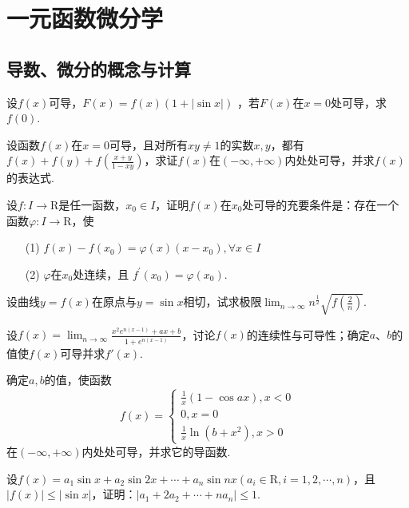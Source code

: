 \chapter{一元函数微分学}\label{cha:2}
\section{导数、微分的概念与计算}
\begin{xiti}
	\item 设$f(x)$可导，$F ( x ) = f ( x ) ( 1 + | \sin x | )$	，若$F(x)$在$x=0$处可导，求$f(0)$.
	\item 设函数$f(x)$在$x=0$可导，且对所有$xy\ne 1$的实数$x,y$，都有$f ( x ) + f ( y ) + f \left( \frac { x + y } { 1 - x y } \right)$，求证$f(x)$在$(-\infty,+\infty)$内处处可导，并求$f(x)$的表达式.
	\item 设$f : I \rightarrow \mathrm { R }$是任一函数，$x_{0}\in I$，证明$f(x)$在$x_{0}$处可导的充要条件是：存在一个函数$\varphi : I \rightarrow \mathrm { R }$，使
	\begin{enumerate}
		\item[(1)] $f ( x ) - f \left( x _ { 0 } \right) = \varphi ( x ) \left( x - x _ { 0 } \right) , \forall x \in I$
		\item[(2)]$\varphi$在$x_{0}$处连续，且 $f ^ { \prime } \left( x _ { 0 } \right) = \varphi \left( x _ { 0 } \right)$.
	\end{enumerate}
	\item 设曲线$y=f(x)$在原点与$y=\sin x$相切，试求极限$\lim _ { n \rightarrow \infty } n ^ { \frac { 1 } { 2 } } \sqrt { f \left( \frac { 2 } { n } \right) }$.
	\item 设$f ( x ) = \lim _ { n \rightarrow \infty } \frac { x ^ { 2 } e ^ { n ( x - 1 ) } + a x + b } { 1 + e ^ { n ( x - 1 ) } }$，讨论$f(x)$的连续性与可导性；确定$a$、$b$的值使$f(x)$可导并求$f'(x)$.
	\item 确定$a,b$的值，使函数
	\[f ( x ) = \left\{ \begin{array} { l } { \frac { 1 } { x } ( 1 - \cos a x ) , x < 0 } \\ { 0 , x = 0 } \\ { \frac { 1 } { x } \ln \left( b + x ^ { 2 } \right) , x > 0 } \end{array} \right.\]
	在$(-\infty,+\infty)$内处处可导，并求它的导函数.
	\item 设$f ( x ) = a _ { 1 } \sin x + a _ { 2 } \sin 2 x + \cdots + a _ { n } \sin n x \left( a _ { i } \in \mathrm { R } , i = 1,2 , \cdots , n \right)$，且$| f ( x ) | \leqslant | \sin x |$，证明：$\left| a _ { 1 } + 2 a _ { 2 } + \cdots + n a _ { n } \right| \leqslant 1$.

\end{xiti}
